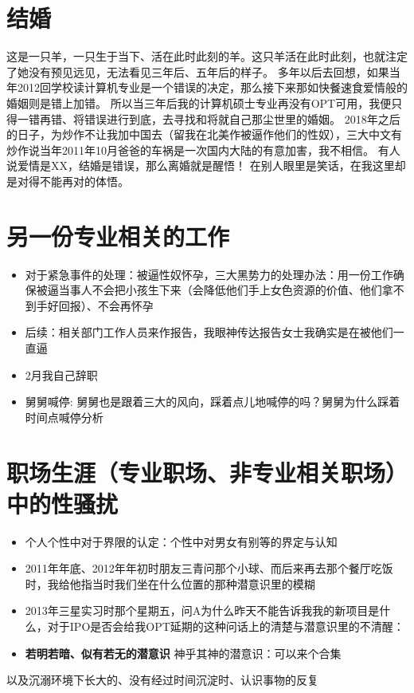 \documentclass[9pt, b5paper]{article}
\begin{document}
\section{结婚}
\label{sec:orgd73113a}
这是一只羊，一只生于当下、活在此时此刻的羊。这只羊活在此时此刻，也就注定了她没有预见远见，无法看见三年后、五年后的样子。
多年以后去回想，如果当年2012回学校读计算机专业是一个错误的决定，那么接下来那如快餐速食爱情般的婚姻则是错上加错。
所以当三年后我的计算机硕士专业再没有OPT可用，我便只得一错再错、将错误进行到底，去寻找和将就自己那尘世里的婚姻。
2018年之后的日子，为炒作不让我加中国去（留我在北美作被逼作他们的性奴），三大中文有炒作说当年2011年10月爸爸的车祸是一次国内大陆的有意加害，我不相信。 
有人说爱情是XX，结婚是错误，那么离婚就是醒悟！
在别人眼里是笑话，在我这里却是对得不能再对的体悟。 

\section{另一份专业相关的工作}
\label{sec:org34842aa}
\begin{itemize}
\item 对于紧急事件的处理：被逼性奴怀孕，三大黑势力的处理办法：用一份工作确保被逼当事人不会把小孩生下来（会降低他们手上女色资源的价值、他们拿不到手好回报）、不会再怀孕
\item 后续：相关部门工作人员来作报告，我眼神传达报告女士我确实是在被他们一直逼
\item 2月我自己辞职
\item 舅舅喊停: 舅舅也是跟着三大的风向，踩着点儿地喊停的吗？舅舅为什么踩着时间点喊停分析
\end{itemize}

\section{职场生涯（专业职场、非专业相关职场）中的性骚扰}
\label{sec:orgff47943}
\begin{itemize}
\item 个人个性中对于界限的认定：个性中对男女有别等的界定与认知
\item 2011年年底、2012年年初时朋友三青问那个小球、而后来再去那个餐厅吃饭时，我给他指当时我们坐在什么位置的那种潜意识里的模糊
\item 2013年三星实习时那个星期五，问A为什么昨天不能告诉我我的新项目是什么，对于IPO是否会给我OPT延期的这种问话上的清楚与潜意识里的不清醒：
\item \textbf{若明若暗、似有若无的潜意识} 神乎其神的潜意识：可以来个合集
\end{itemize}
以及沉溺环境下长大的、没有经过时间沉淀时、认识事物的反复
\end{document}
